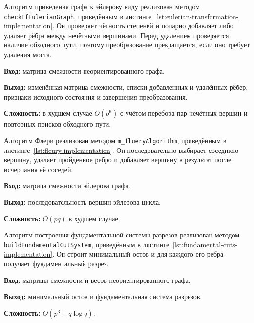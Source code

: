 Алгоритм приведения графа к эйлерову виду реализован методом \texttt{checkIfEulerianGraph}, приведённым в листинге~\ref{lst:eulerian-transformation-implementation}. Он проверяет чётность степеней и попарно добавляет либо удаляет рёбра между нечётными вершинами. Перед удалением проверяется наличие обходного пути, поэтому преобразование прекращается, если оно требует удаления моста.

\textbf{Вход:} матрица смежности неориентированного графа.

\textbf{Выход:} изменённая матрица смежности, списки добавленных и удалённых рёбер, признаки исходного состояния и завершения преобразования.

\textbf{Сложность:} в худшем случае $O(p^6)$ с учётом перебора пар нечётных вершин и повторных поисков обходного пути.


Алгоритм Флери реализован методом \texttt{m\_flueryAlgorithm}, приведённым в листинге~\ref{lst:fleury-implementation}. Он последовательно выбирает соседнюю вершину, удаляет пройденное ребро и добавляет вершину в результат после исчерпания её соседей.

\textbf{Вход:} матрица смежности эйлерова графа.

\textbf{Выход:} последовательность вершин эйлерова цикла.

\textbf{Сложность:} $O(pq)$ в худшем случае.


Алгоритм построения фундаментальной системы разрезов реализован методом \texttt{buildFundamentalCutSystem}, приведённым в листинге~\ref{lst:fundamental-cuts-implementation}. Он строит минимальный остов и для каждого его ребра получает фундаментальный разрез.

\textbf{Вход:} матрицы смежности и весов неориентированного графа.

\textbf{Выход:} минимальный остов и фундаментальная система разрезов.

\textbf{Сложность:} $O(p^3+q\log q)$.


